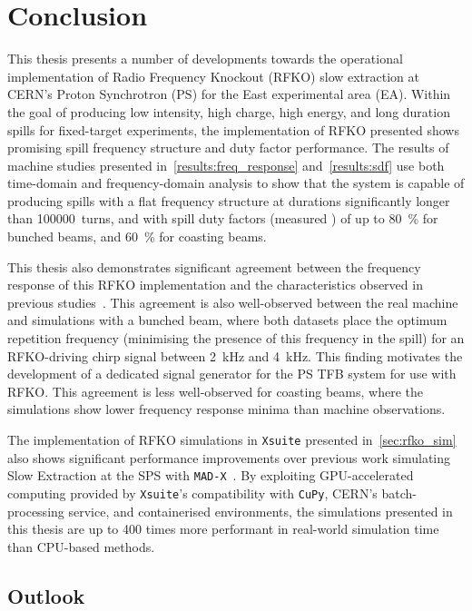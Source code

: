 \documentclass[a4paper,twoside,11pt]{report}
\begin{document}
\chapter{Conclusion}\label{chap:conclusion}

This thesis presents a number of developments towards the operational implementation of Radio Frequency Knockout (RFKO) slow extraction at CERN's Proton Synchrotron (PS) for the East experimental area (EA). Within the goal of producing low intensity, high charge, high energy, and long duration spills for fixed-target experiments, the implementation of RFKO presented shows promising spill frequency structure and duty factor performance. The results of machine studies presented in~\autoref{results:freq_response} and~\autoref{results:sdf} use both time-domain and frequency-domain analysis to show that the system is capable of producing spills with a flat frequency structure at durations significantly longer than \qty{100000}{turns}, and with spill duty factors (measured ) of up to \qty{80}{\percent} for bunched beams, and \qty{60}{\percent} for coasting beams.

This thesis also demonstrates significant agreement between the frequency response of this RFKO implementation and the characteristics observed in previous studies~\cite{wepmp008,Pari:2780495}. This agreement is also well-observed between the real machine and simulations with a bunched beam, where both datasets place the optimum repetition frequency (minimising the presence of this frequency in the spill) for an RFKO-driving chirp signal between \qty{2}{\kilo\hertz} and \qty{4}{\kilo\hertz}. This finding motivates the development of a dedicated signal generator for the PS TFB system for use with RFKO. 
This agreement is less well-observed for coasting beams, where the simulations show lower frequency response minima than machine observations. 

The implementation of RFKO simulations in \verb|Xsuite| presented in~\autoref{sec:rfko_sim} also shows significant performance improvements over previous work simulating Slow Extraction at the SPS with \verb|MAD-X|~\cite{Schicho:2039579}. By exploiting GPU-accelerated computing provided by \verb|Xsuite|'s compatibility with \verb|CuPy|, CERN's batch-processing service, and containerised environments, the simulations presented in this thesis are up to 400 times more performant in real-world simulation time than CPU-based methods.

\section{Outlook}
\end{document}
